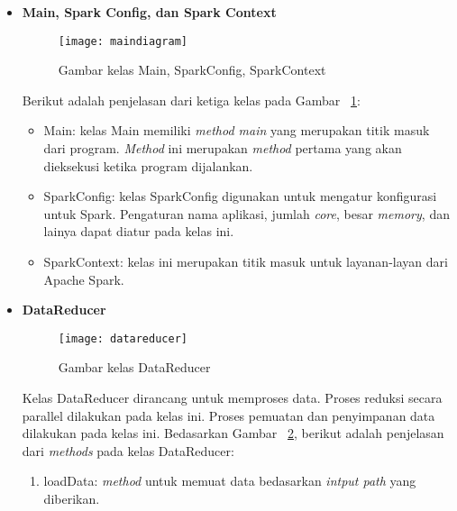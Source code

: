 \begin{itemize}

\item \textbf{Main, Spark Config, dan Spark Context}\\

\begin{figure}[H]
    \centering  
    \texttt{[image: maindiagram]}  
    \caption[Gambar kelas Main, SparkConfig, SparkContext]{Gambar kelas Main, SparkConfig, SparkContext} 
    \label{fig:maindiagram} 
\end{figure}

Berikut adalah penjelasan dari ketiga kelas pada Gambar ~\ref{fig:maindiagram}:

\begin{itemize}

\item Main: kelas Main memiliki \textit{method main}  yang merupakan titik masuk dari program. \textit{Method} ini merupakan \textit{method} pertama yang akan dieksekusi ketika program dijalankan.

\item SparkConfig: kelas SparkConfig digunakan untuk mengatur konfigurasi untuk Spark. Pengaturan nama aplikasi, jumlah \textit{core}, besar \textit{memory}, dan lainya dapat diatur pada kelas ini.

\item SparkContext: kelas ini merupakan titik masuk untuk layanan-layan dari Apache Spark.\\

\end{itemize}


\item \textbf{DataReducer}\\

\begin{figure}[H]
    \centering  
    \texttt{[image: datareducer]}  
    \caption[Gambar kelas DataReducer]{Gambar kelas DataReducer} 
    \label{fig:datareducer} 
\end{figure}

Kelas DataReducer dirancang untuk memproses data. Proses reduksi secara parallel dilakukan pada kelas ini. Proses pemuatan dan penyimpanan data dilakukan pada kelas ini. Bedasarkan Gambar ~\ref{fig:datareducer}, berikut adalah penjelasan dari \textit{methods} pada kelas DataReducer:

\begin{enumerate}

\item loadData: \textit{method} untuk memuat data bedasarkan \textit{intput path} yang diberikan.


\end{enumerate}
\end{itemize}
